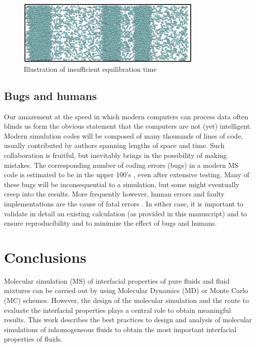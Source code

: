 \documentclass{scrbook}
\begin{document}
\begin{figure}
\includegraphics[width=0.8\textwidth]{gfx/image77.png}
\caption{Illustration of insufficient equilibration time}
\label{fig:26}
\end{figure}

\section{Bugs and humans}

Our amazement at the speed in which modern computers can process data often
blinds us form the obvious statement that the computers are not (yet)
intelligent. Modern simulation codes will be composed of many thousands of
lines of code, usually contributed by authors spanning lengths of space and
time. Such collaboration is fruitful, but inevitably brings in the possibility
of making mistakes. The corresponding number of coding errors (bugs) in
a modern MS code is estimated to be in the upper 100's \citep{schappals2017},
even after extensive
testing. Many of these bugs will be inconsequential to a simulation, but some
might eventually creep into the results. More frequently however, human errors
and faulty implementations are the cause of fatal errors
\citep{wong2016}. In either case, it is important to validate in
detail an existing calculation (as provided in this manuscript) and to ensure
reproducibility and to minimize the effect of bugs and humans.  

\chapter{Conclusions}

Molecular simulation (MS) of interfacial properties of pure fluids and fluid
mixtures can be carried out by using Molecular Dynamics (MD) or Monte Carlo
(MC) schemes. However, the design of the molecular simulation and the route to
evaluate the interfacial properties plays a central role to obtain meaningful
results. This work describes the best practices to design and analysis of
molecular simulations of inhomogeneous fluids to obtain the most important
interfacial properties of fluids.
\end{document}
